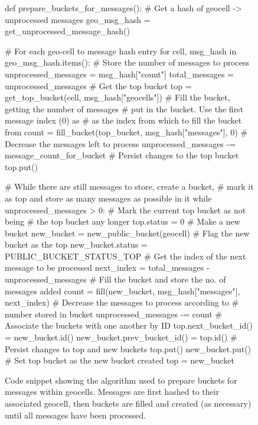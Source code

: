 \documentclass{article}
\begin{document}
\begin{figure}
\begin{center}
\begin{minipage}{5.5in}%
\begin{python}[caption={Bucket preparation algorithm in Python},label={code:ec_GA}] 
def prepare_buckets_for_messages():
  # Get a hash of geocell -> unprocessed messages
  geo_msg_hash = get_unprocessed_message_hash()

  # For each geo-cell to message hash entry
  for cell, msg_hash in geo_msg_hash.items():
    # Store the number of messages to process
    unprocessed_messages = msg_hash["count"]
    total_messages = unprocessed_messages
    # Get the top bucket
    top = get_top_bucket(cell, msg_hash["geocells"])
    # Fill the bucket, getting the number of messages
    # put in the bucket. Use the first message index (0) as
    # as the index from which to fill the bucket from
    count = fill_bucket(top_bucket, msg_hash["messages"], 0)
    # Decrease the messages left to process
    unprocessed_messages -= message_count_for_bucket
    # Persist changes to the top bucket
    top.put()

    # While there are still messages to store, create a bucket,
    # mark it as top and store as many messages as possible in it   
    while unprocessed_messages > 0:
      # Mark the current top bucket as not being
      # the top bucket any longer
      top.status = 0
      # Make a new bucket
      new_bucket = new_public_bucket(geocell)
      # Flag the new bucket as the top
      new_bucket.status = PUBLIC_BUCKET_STATUS_TOP
      # Get the index of the next message to be processed
      next_index = total_messages - unprocessed_messages
      # Fill the bucket and store the no. of messages added
      count = fill(new_bucket, msg_hash["messages"], next_index)
      # Decrease the messages to process according to
      # number stored in bucket
      unprocessed_messages -= count
      # Associate the buckets with one another by ID
      top.next_bucket_id() = new_bucket.id()
      new_bucket.prev_bucket_id() = top.id()
      # Persist changes to top and new buckets
      top.put()
      new_bucket.put()
      # Set top bucket as the new bucket created
      top = new_bucket
\end{python}
\end{minipage}
\caption{Code snippet showing the algorithm used to prepare buckets for messages within geocells. Messages are first hashed to their associated geocell, then buckets are filled and created (as necessary) until all messages have been processed.\label{fig:bucket_preparation_algorithm}}
\end{center}
\end{figure}
\end{document}
